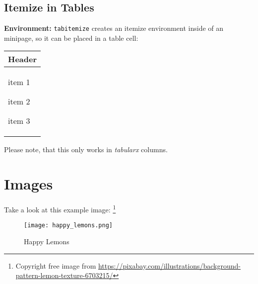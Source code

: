 \documentclass[10pt]{article}
\newcommand{\environmentcmd}[1]{\par\noindent\textbf{Environment:} \lstinline^#1^}
\begin{document}
\subsection{Itemize in Tables}
\environmentcmd{tabitemize} creates an itemize environment inside of an minipage, so it can be placed in a table cell:

\begin{table}[!h]
  \centering
  \begin{tabularx}{0.5\linewidth}{Y}
    \toprule
    Header            \\
    \midrule
    \begin{tabitemize}
      \item item 1
      \item item 2
      \item item 3
    \end{tabitemize} \\
    \bottomrule
  \end{tabularx}
\end{table}

Please note, that this only works in \emph{tabularx} columns.

\section{Images}
Take a look at this example image: \footnote{Copyright free image from \url{https://pixabay.com/illustrations/background-pattern-lemon-texture-6703215/}}
\begin{figure}[h!t]
  \centering
  \texttt{[image: happy\_lemons.png]}
  \caption{Happy Lemons}
  \label{fig:happylemons}
\end{figure}
\end{document}
